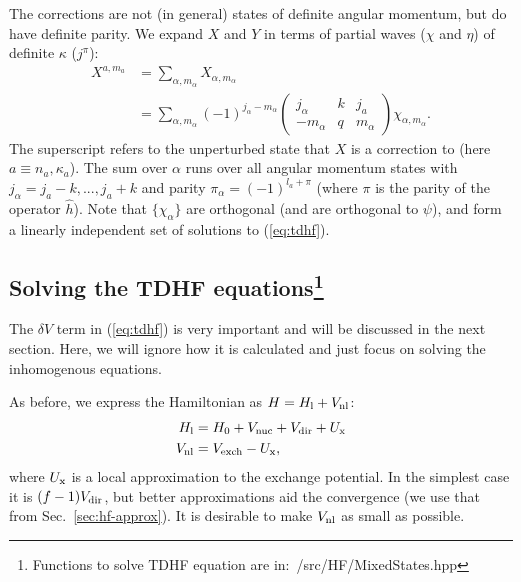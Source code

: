 \documentclass[10pt,twocolumn,a4paper]{article}%
\newcommand{\threej}[6]{\ensuremath{\begin{pmatrix}#1&#2&#3\\#4&#5&#6\end{pmatrix}}}	%
\renewcommand{\a}{\ensuremath{\alpha}}
\renewcommand{\k}{\ensuremath{\kappa}}
\newcommand{\vk}{\ensuremath{\varkappa}}
\begin{document}
The corrections are not (in general) states of definite angular momentum, but do have definite parity.
We expand $X$ and $Y$ in terms of partial waves ($\chi$ and $\eta$) of definite $\k$ ($j^\pi$):
\begin{equation}\begin{split}
\label{eq:dPsi-pw}
X^{a,m_a} &= \sum_{\a,m_\a} X_{\a,m_\a}\\
 &= \sum_{\a,m_\a}(-1)^{j_\a-m_\a}\threej{j_\a}{k}{j_a}{-m_\a}{q}{m_\a}\chi_{\a, m_\a}.
\end{split}\end{equation}
The superscript refers to the unperturbed state that $X$ is a correction to (here $a\equiv n_a,\k_a$).
The sum over $\alpha$ runs over all angular momentum states with $j_\alpha = j_a - k, ..., j_a+k$ and parity $\pi_\alpha = (-1)^{l_a + \pi}$ (where $\pi$ is the parity of the operator $\hat h$).
Note that $\{\chi_\a\}$ are orthogonal (and are orthogonal to $\psi$), and form a linearly independent set of solutions to (\ref{eq:tdhf}).




\subsection[Solving the TDHF equations]{Solving the TDHF equations\label{sec:tdhf-solve}\footnote{Functions to solve TDHF equation are in:~/src/HF/MixedStates.hpp}}

The $\delta V$ term in (\ref{eq:tdhf}) is very important and will be discussed in the next section.
Here, we will ignore how it is calculated and just focus on solving the inhomogenous equations.


As before, we express the Hamiltonian as $H =H_{\rm l} + V_{\rm nl} $: %
\begin{align}
H_{\rm l}&= H_0 + V_{\rm nuc} +  V_{\rm dir} +  U_{\rm x} \\
V_{\rm nl} &= V_{\rm exch} - U_{\rm x},
\end{align}
where $U_{\rm x}$ is a local approximation to the exchange potential.
In the simplest case it is $(f-1)V_{\rm dir}$, but better approximations aid the convergence (we use that from Sec.~\ref{sec:hf-approx}).
It is desirable to make  $V_{\rm nl}$ as small as possible.
%
\end{document}
